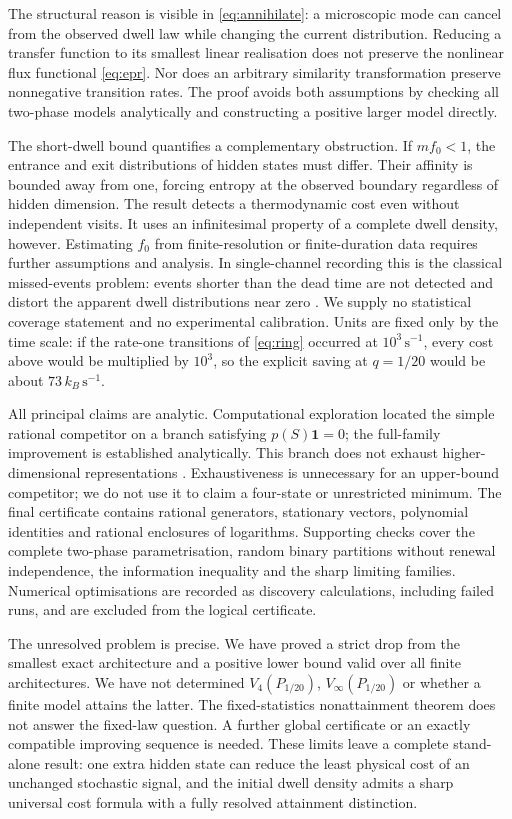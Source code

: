 \documentclass[11pt,a4paper]{article}
\theoremstyle{remark}\newtheorem{remark}[theorem]{Remark}
\newcommand{\one}{\mathbf 1}
\begin{document}
The structural reason is visible in \eqref{eq:annihilate}: a microscopic
mode can cancel from the observed dwell law while changing the current
distribution. Reducing a transfer function to its smallest linear
realisation does not preserve the nonlinear flux functional
\eqref{eq:epr}. Nor does an arbitrary similarity transformation preserve
nonnegative transition rates. The proof avoids both assumptions by checking
all two-phase models analytically and constructing a positive larger model
directly.

The short-dwell bound quantifies a complementary obstruction. If
$mf_0<1$, the entrance and exit distributions of hidden states must differ.
Their affinity is bounded away from one, forcing entropy at the observed
boundary regardless of hidden dimension. The result detects a thermodynamic
cost even without independent visits. It uses an infinitesimal property of a
complete dwell density, however. Estimating $f_0$ from finite-resolution or
finite-duration data requires further assumptions and analysis. In
single-channel recording this is the classical missed-events problem: events
shorter than the dead time are not detected and distort the apparent dwell
distributions near zero \cite{hjc}. We supply no
statistical coverage statement and no experimental calibration. Units are
fixed only by the time scale: if the rate-one transitions of \eqref{eq:ring}
occurred at $10^3\,\mathrm{s}^{-1}$, every cost above would be multiplied by
$10^3$, so the explicit saving at $q=1/20$ would be about
$73\,k_B\,\mathrm{s}^{-1}$.

All principal claims are analytic. Computational exploration located the
simple rational competitor on a branch satisfying $p(S)\one=0$; the
full-family improvement is established analytically. This branch
does not exhaust higher-dimensional representations \cite{aznagulov}.
Exhaustiveness is unnecessary for an upper-bound competitor; we do not use
it to claim a four-state or unrestricted minimum. The final certificate
contains rational generators, stationary vectors, polynomial identities and
rational enclosures of logarithms. Supporting checks cover the complete
two-phase parametrisation, random binary partitions without renewal
independence, the information inequality and the sharp limiting families.
Numerical optimisations are recorded as discovery calculations, including
failed runs, and are excluded from the logical certificate.

The unresolved problem is precise. We have proved a strict drop from the
smallest exact architecture and a positive lower bound valid over all finite
architectures. We have not determined $V_4(P_{1/20})$, $V_\infty(P_{1/20})$
or whether a finite model attains the latter. The fixed-statistics
nonattainment theorem does not answer the fixed-law question. A further
global certificate or an exactly compatible improving sequence is needed.
These limits leave a complete stand-alone result: one extra hidden state can
reduce the least physical cost of an unchanged stochastic signal, and the
initial dwell density admits a sharp universal cost formula with a fully
resolved attainment distinction.
\end{document}

